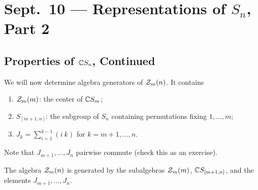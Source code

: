 \chapter{Sept.~10 --- Representations of \texorpdfstring{$S_n$}{Sn}, Part 2}

\section{Properties of \texorpdfstring{$\mathbb{C} S_n$}{CSn}, Continued}

\begin{remark}
  We will now determine
  algebra generators of
  $\mathcal{Z}_m(n)$. It contains
  \begin{enumerate}
    \item $\mathcal{Z}_m(m)$: the center of
      $\mathbb{C} S_m$;
    \item $S_{[m + 1, n]}$: the subgroup
      of $S_n$ containing permutations
      fixing $1, \dots, m$;
    \item $J_k = \sum_{i = 1}^{k - 1} (i\ k)$
      for $k = m + 1, \dots, n$.
  \end{enumerate}
  Note that $J_{m + 1}, \dots, J_n$
  pairwise commute (check this as
  an exercise).
\end{remark}

\begin{theorem}
  The algebra $\mathcal{Z}_m(n)$ is generated by
  the subalgebras $\mathcal{Z}_m(m)$,
  $\mathbb{C} S_{[m + 1, n]}$, and the elements
  $J_{m + 1}, \dots, J_n$.
\end{theorem}

